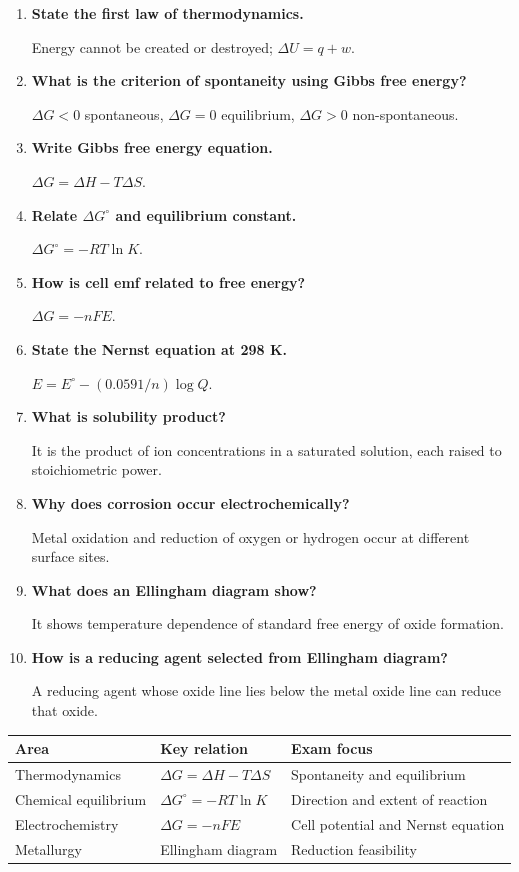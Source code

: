 \documentclass[12pt,a4paper]{article}
\newcommand{\Q}[1]{\textbf{#1}\par\noindent\ignorespaces}
\begin{document}
\begin{tcolorbox}[exambox, title={Frequently Asked / Viva Questions}]
\begin{enumerate}[topsep=0pt, label=\textbf{Q\arabic*.}, itemsep=5pt]
  \item \Q{State the first law of thermodynamics.}
    Energy cannot be created or destroyed; $\Delta U=q+w$.
  \item \Q{What is the criterion of spontaneity using Gibbs free energy?}
    $\Delta G<0$ spontaneous, $\Delta G=0$ equilibrium, $\Delta G>0$ non-spontaneous.
  \item \Q{Write Gibbs free energy equation.}
    $\Delta G=\Delta H-T\Delta S$.
  \item \Q{Relate $\Delta G^\circ$ and equilibrium constant.}
    $\Delta G^\circ=-RT\ln K$.
  \item \Q{How is cell emf related to free energy?}
    $\Delta G=-nFE$.
  \item \Q{State the Nernst equation at 298 K.}
    $E=E^\circ-(0.0591/n)\log Q$.
  \item \Q{What is solubility product?}
    It is the product of ion concentrations in a saturated solution, each raised to stoichiometric power.
  \item \Q{Why does corrosion occur electrochemically?}
    Metal oxidation and reduction of oxygen or hydrogen occur at different surface sites.
  \item \Q{What does an Ellingham diagram show?}
    It shows temperature dependence of standard free energy of oxide formation.
  \item \Q{How is a reducing agent selected from Ellingham diagram?}
    A reducing agent whose oxide line lies below the metal oxide line can reduce that oxide.
\end{enumerate}
\end{tcolorbox}

\begin{tcolorbox}[tikzbox, title={Summary Reference Table}]
\begin{tabularx}{\linewidth}{|B{3cm}|Y|Y|}
\hline
\textbf{Area} & \textbf{Key relation} & \textbf{Exam focus} \\
\hline
Thermodynamics & $\Delta G=\Delta H-T\Delta S$ & Spontaneity and equilibrium \\
\hline
Chemical equilibrium & $\Delta G^\circ=-RT\ln K$ & Direction and extent of reaction \\
\hline
Electrochemistry & $\Delta G=-nFE$ & Cell potential and Nernst equation \\
\hline
Metallurgy & Ellingham diagram & Reduction feasibility \\
\hline
\end{tabularx}
\end{tcolorbox}
\end{document}
